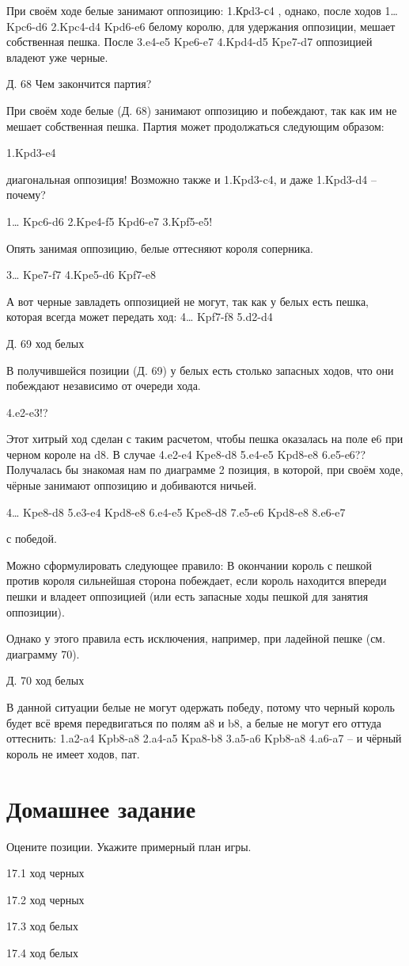 При своём ходе белые занимают оппозицию: 1.Крd3-с4 , однако, после ходов 1… Kpc6-d6 2.Kpc4-d4 Kpd6-e6 белому королю, для удержания оппозиции, мешает собственная пешка. После 3.e4-e5 Kpe6-e7 4.Kpd4-d5 Kpe7-d7 оппозицией владеют уже черные.
 
Д. 68 Чем закончится партия?

При своём ходе белые (Д. 68) занимают оппозицию и побеждают, так как им не мешает собственная пешка. Партия может продолжаться следующим образом: 

1.Kpd3-e4 

диагональная оппозиция! Возможно также и 1.Kpd3-c4, и даже 1.Kpd3-d4 – почему?

1… Kpc6-d6 2.Kpe4-f5 Kpd6-e7 3.Kpf5-e5! 

Опять занимая оппозицию, белые оттесняют короля соперника.

3… Kpe7-f7 4.Kpe5-d6 Kpf7-e8

А вот черные завладеть оппозицией не могут, так как у белых есть пешка, которая всегда может передать ход: 4… Kpf7-f8 5.d2-d4
 
Д. 69 ход белых

В получившейся позиции (Д. 69) у белых есть столько запасных ходов, что они побеждают независимо от очереди хода.

4.e2-e3!?

Этот хитрый ход сделан с таким расчетом, чтобы пешка оказалась на поле е6 при черном короле на d8. В случае 4.e2-e4 Kpe8-d8 5.e4-e5 Kpd8-e8 6.e5-e6?? Получалась бы знакомая нам по диаграмме 2 позиция, в которой, при своём ходе, чёрные занимают оппозицию и добиваются ничьей.

4… Kpe8-d8 5.e3-e4 Kpd8-e8 6.e4-e5 Kpe8-d8 7.e5-e6 Kpd8-e8 8.e6-e7

с победой.

Можно сформулировать следующее правило:
В окончании король с пешкой против короля сильнейшая сторона побеждает, если король находится впереди пешки и владеет оппозицией (или есть запасные ходы пешкой для занятия оппозиции). 

Однако у этого правила есть исключения, например, при ладейной пешке (см. диаграмму 70).
 
Д. 70 ход белых

В данной ситуации белые не могут одержать победу, потому что черный король будет всё время передвигаться по полям а8 и b8, а белые не могут его оттуда оттеснить: 1.a2-a4 Kpb8-a8 2.a4-a5 Kpa8-b8 3.a5-a6 Kpb8-a8 4.a6-a7 – и чёрный король не имеет ходов, пат.

\section{Домашнее задание}

Оцените позиции. Укажите примерный план игры.
 
 
17.1 ход черных
 
17.2 ход черных
 
 
17.3 ход белых
 
17.4 ход белых
